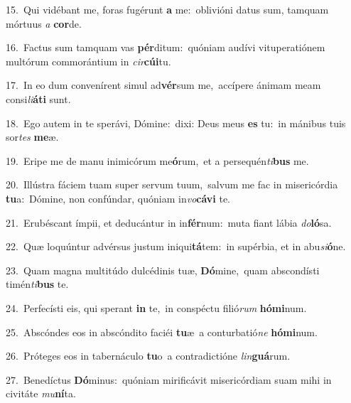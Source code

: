 {\numbfont\textcolor{\numbcolor}{15.}}~Qui vidébant me, foras fugérunt \textbf{a} me:~\star oblivióni datus sum, tamquam mórtuus \textit{a} \textbf{cor}\-de.\par
{\numbfont\textcolor{\numbcolor}{16.}}~Factus sum tamquam vas \textbf{pér}\-ditum:~\star quóniam audívi vituperatiónem multórum commorántium in \textit{cir}\-\textbf{cú}\textbf{i}tu.\par
{\numbfont\textcolor{\numbcolor}{17.}}~In eo dum convenírent simul ad\-\textbf{vér}\-sum me,~\star accípere ánimam meam consi\-\textit{li}\-\textbf{á}\textbf{ti} sunt.\par
{\numbfont\textcolor{\numbcolor}{18.}}~Ego autem in te sperávi, Dómine:~\dagger dixi: Deus meus \textbf{es} tu:~\star in mánibus tuis sor\textit{tes} \textbf{me}\-æ.\par
{\numbfont\textcolor{\numbcolor}{19.}}~Eripe me de manu inimicórum me\-\textbf{ó}\-rum,~\star et a persequén\-\textit{ti}\-\textbf{bus} me.\par
{\numbfont\textcolor{\numbcolor}{20.}}~Illústra fáciem tuam super servum tuum,~\dagger salvum me fac in misericórdia \textbf{tu}\-a:~\star Dómine, non confúndar, quóniam in\-\textit{vo}\-\textbf{cá}\textbf{vi} te.\par
{\numbfont\textcolor{\numbcolor}{21.}}~Erubéscant ímpii, et deducántur in in\-\textbf{fér}\-num:~\star muta fiant lábia \textit{do}\-\textbf{ló}sa.\par
{\numbfont\textcolor{\numbcolor}{22.}}~Quæ loquúntur advérsus justum iniqui\-\textbf{tá}\-tem:~\star in supérbia, et in abu\-\textit{si}\-\textbf{ó}ne.\par
{\numbfont\textcolor{\numbcolor}{23.}}~Quam magna multitúdo dulcédinis tuæ, \textbf{Dó}\-mine,~\star quam abscondísti timén\-\textit{ti}\-\textbf{bus} te.\par
{\numbfont\textcolor{\numbcolor}{24.}}~Perfecísti eis, qui sperant \textbf{in} te,~\star in conspéctu filió\textit{rum} \textbf{hó}\-\textbf{mi}num.\par
{\numbfont\textcolor{\numbcolor}{25.}}~Abscóndes eos in abscóndito faciéi \textbf{tu}\-æ~\star a conturbatió\textit{ne} \textbf{hó}\-\textbf{mi}num.\par
{\numbfont\textcolor{\numbcolor}{26.}}~Próteges eos in tabernáculo \textbf{tu}\-o~\star a contradictióne \textit{lin}\-\textbf{guá}rum.\par
{\numbfont\textcolor{\numbcolor}{27.}}~Benedíctus \textbf{Dó}\-minus:~\star quóniam mirificávit misericórdiam suam mihi in civitáte \textit{mu}\-\textbf{ní}ta.\par
